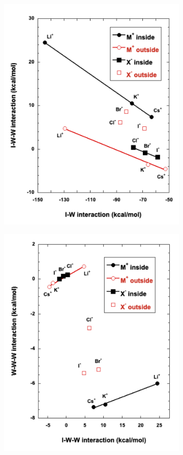 \documentclass[11pt, proquest]{uwthesis}[2020/02/24]
\begin{document}
\begin{figure}
  \begin{subfigure}[t]{.5\textwidth}
    \centering
    \includegraphics[width=.9\linewidth]{Figures/Chapter_3/figure_9_bl.pdf}
  \end{subfigure}
  \hfill
  \begin{subfigure}[t]{.5\textwidth}
    \centering
    \includegraphics[width=.9\linewidth]{Figures/Chapter_3/figure_9_br.pdf}

\end{subfigure}
\end{figure}
\end{document}
